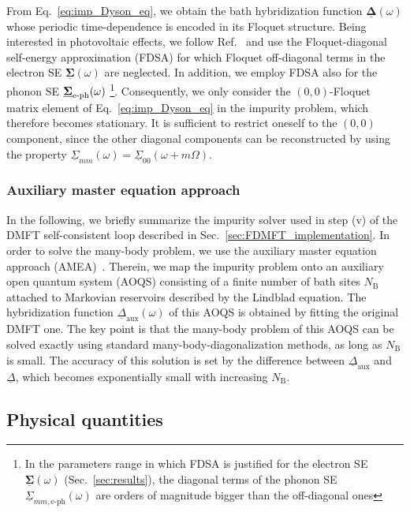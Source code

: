 \documentclass[aps,prb,groupedaddress,showpacs,twocolumn,superscriptaddress,10pt]{revtex4-2}
\newcommand{\mat}[1]{\bm{#1}} %
\newcommand{\kel}[1]{\underline{#1}} %
\begin{document}
From Eq.~\eqref{eq:imp_Dyson_eq}, we obtain the bath hybridization function $\kel{\mat\Delta}(\omega)$ whose periodic time-dependence is encoded in its Floquet structure. Being interested in photovoltaic effects, we follow Ref.~\cite{so.do.18} and use the Floquet-diagonal self-energy approximation (FDSA) for which Floquet off-diagonal terms in the electron SE $\kel{\mat{\Sigma}}(\omega)$ are neglected. In addition, we employ FDSA also for the phonon SE $\underline{\bf{\Sigma}}_{\text{e-ph}}(\omega)$ \footnote{In the parameters range in which FDSA is justified for the electron SE $\kel{\mat{\Sigma}}(\omega)$ (Sec.~\ref{sec:results}), the diagonal terms of the phonon SE $\underline{\Sigma}_{mm,\text{e-ph}}(\omega)$ are orders of magnitude bigger than the off-diagonal ones}. Consequently, we only consider the 
 $(0,0)$-Floquet matrix element of Eq.~\eqref{eq:imp_Dyson_eq} in the impurity problem, which therefore becomes stationary. It is sufficient to restrict oneself to the $(0,0)$ component, since the other diagonal components can be reconstructed by using the property $\kel{\Sigma}_{mm}(\omega) = \kel{\Sigma}_{00}(\omega+m\Omega)$. 


\subsubsection{Auxiliary master equation approach}
\label{sec:amea}

In the following, we briefly summarize the impurity solver used in step (v) of the DMFT self-consistent loop described in Sec.~\ref{sec:FDMFT_implementation}. In order to solve the many-body problem,
 we use the auxiliary master equation approach (AMEA)~\cite{ar.kn.13,do.nu.14,do.ga.15,do.so.17}. Therein, we map the impurity problem onto an auxiliary open quantum system (AOQS) consisting of a finite number of bath sites $N_{\text{B}}$ attached to Markovian reservoirs described by the Lindblad equation. The  hybridization function $\kel{\Delta}_{\text{aux}}(\omega)$ of this AOQS is obtained by fitting the original DMFT one. The key point is that the many-body problem of this AOQS can be solved exactly 
using standard many-body-diagonalization methods, as long as  $N_{\text{B}}$ is small.
The accuracy of this solution is set by the difference between
 $\kel{\Delta}_{\text{aux}}$ and $\kel{\Delta}$, which  becomes exponentially  small with increasing $N_{\text{B}}$.
	
\subsection{Physical quantities}
\label{sec:observables}  
\end{document}
